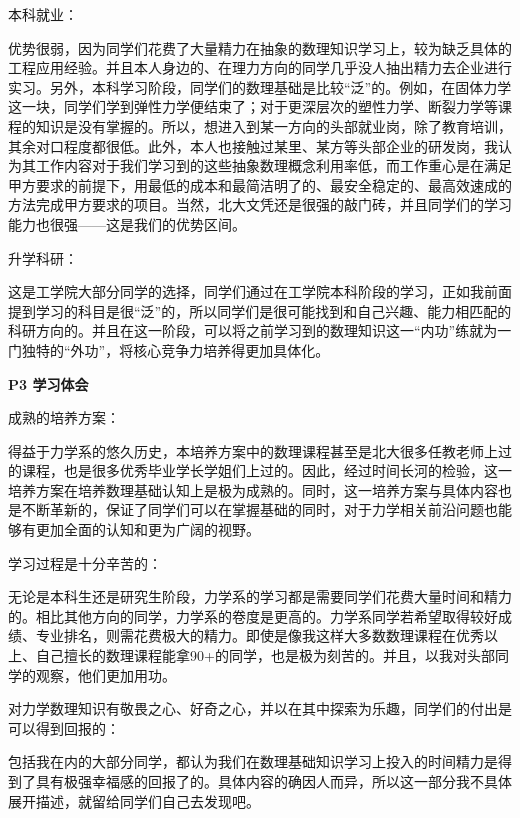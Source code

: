 \documentclass[11pt,oneside]{book}
\begin{document}
本科就业：

优势很弱，因为同学们花费了大量精力在抽象的数理知识学习上，较为缺乏具体的工程应用经验。并且本人身边的、在理力方向的同学几乎没人抽出精力去企业进行实习。另外，本科学习阶段，同学们的数理基础是比较“泛”的。例如，在固体力学这一块，同学们学到弹性力学便结束了；对于更深层次的塑性力学、断裂力学等课程的知识是没有掌握的。所以，想进入到某一方向的头部就业岗，除了教育培训，其余对口程度都很低。此外，本人也接触过某里、某方等头部企业的研发岗，我认为其工作内容对于我们学习到的这些抽象数理概念利用率低，而工作重心是在满足甲方要求的前提下，用最低的成本和最简洁明了的、最安全稳定的、最高效速成的方法完成甲方要求的项目。当然，北大文凭还是很强的敲门砖，并且同学们的学习能力也很强——这是我们的优势区间。

\vspace{10pt}

升学科研：

这是工学院大部分同学的选择，同学们通过在工学院本科阶段的学习，正如我前面提到学习的科目是很“泛”的，所以同学们是很可能找到和自己兴趣、能力相匹配的科研方向的。并且在这一阶段，可以将之前学习到的数理知识这一“内功”练就为一门独特的“外功”，将核心竞争力培养得更加具体化。

\vspace{10pt}

\textbf{P3 学习体会}

成熟的培养方案：

得益于力学系的悠久历史，本培养方案中的数理课程甚至是北大很多任教老师上过的课程，也是很多优秀毕业学长学姐们上过的。因此，经过时间长河的检验，这一培养方案在培养数理基础认知上是极为成熟的。同时，这一培养方案与具体内容也是不断革新的，保证了同学们可以在掌握基础的同时，对于力学相关前沿问题也能够有更加全面的认知和更为广阔的视野。

\vspace{10pt}

学习过程是十分辛苦的：

无论是本科生还是研究生阶段，力学系的学习都是需要同学们花费大量时间和精力的。相比其他方向的同学，力学系的卷度是更高的。力学系同学若希望取得较好成绩、专业排名，则需花费极大的精力。即使是像我这样大多数数理课程在优秀以上、自己擅长的数理课程能拿90+的同学，也是极为刻苦的。并且，以我对头部同学的观察，他们更加用功。

\vspace{10pt}

对力学数理知识有敬畏之心、好奇之心，并以在其中探索为乐趣，同学们的付出是可以得到回报的：

包括我在内的大部分同学，都认为我们在数理基础知识学习上投入的时间精力是得到了具有极强幸福感的回报了的。具体内容的确因人而异，所以这一部分我不具体展开描述，就留给同学们自己去发现吧。
\end{document}
